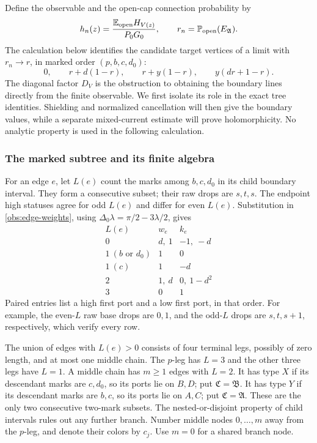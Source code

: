 Define the observable and the open-cap connection probability by
\begin{equation}
 h_n(z)=\frac{\mathbb E_{\rm open}H_{V(z)}}{P_0G_0},
 \qquad r_n=\mathbb P_{\rm open}(E_{\mathfrak A}).
 \label{obs:observable}
\end{equation}
The calculation below identifies the candidate target vertices of a
limit with $r_n\to r$, in marked order $(p,b,c,d_0)$:
\[
 0,\qquad r+d(1-r),\qquad r+y(1-r),
 \qquad y(dr+1-r).
\]
The diagonal factor $D_V$ is the obstruction to obtaining the boundary
lines directly from the finite observable.  We first isolate its role
in the exact tree identities.  Shielding and normalized cancellation
will then give the boundary values, while a separate mixed-current
estimate will prove holomorphicity.  No analytic property is used in
the following calculation.

\subsubsection{The marked subtree and its finite algebra}

For an edge $e$, let $L(e)$ count the marks among $b,c,d_0$ in its
child boundary interval.  They form a consecutive subset; their raw
drops are $s,t,s$.  The endpoint high statuses agree for odd $L(e)$
and differ for even $L(e)$.  Substitution in
\eqref{obs:edge-weights}, using
$\Delta_0\lambda=\pi/2-3\lambda/2$, gives
\begin{equation}
 \begin{array}{c|cc}
 L(e)&w_e&k_e\\ \hline
 0&d,\ 1&-1,\ -d\\
 1\ (b\text{ or }d_0)&1&0\\
 1\ (c)&1&-d\\
 2&1,\ d&0,\ 1-d^2\\
 3&0&1
 \end{array}
 \label{obs:table}
\end{equation}
Paired entries list a high first port and a low first port, in that
order.  For example, the even-$L$ raw base drops are $0,1$, and the
odd-$L$ drops are $s,t,s+1$, respectively, which verify every row.

The union of edges with $L(e)>0$ consists of four terminal legs,
possibly of zero length, and at most one middle chain.  The $p$-leg
has $L=3$ and the other three legs have $L=1$.  A middle chain has
$m\ge1$ edges with $L=2$.  It has type $X$ if its descendant marks
are $c,d_0$, so its ports lie on $B,D$; put $\mathfrak C=\mathfrak B$.
It has type $Y$ if its descendant marks are $b,c$, so its ports lie
on $A,C$; put $\mathfrak C=\mathfrak A$.  These are the only two
consecutive two-mark subsets.  The nested-or-disjoint property of
child intervals rules out any further branch.  Number middle nodes
$0,\ldots,m$ away from the $p$-leg, and denote their colors by $c_j$.
Use $m=0$ for a shared branch node.

